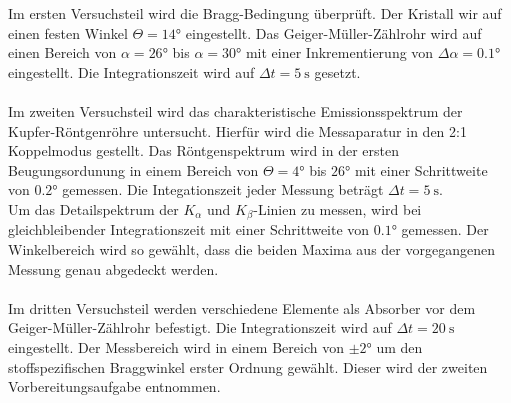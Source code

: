 Im ersten Versuchsteil wird die Bragg-Bedingung überprüft. Der Kristall wir auf einen festen Winkel $Θ = 14°$ eingestellt.
Das Geiger-Müller-Zählrohr wird auf einen Bereich von $α = 26°$ bis $α = 30°$ mit einer Inkrementierung von $Δα = 0.1°$ eingestellt. Die Integrationszeit wird auf $Δt = \SI{5}{\second}$ gesetzt.\\
\\
Im zweiten Versuchsteil wird das charakteristische Emissionsspektrum der Kupfer-Röntgenröhre untersucht. Hierfür wird die Messaparatur in den 2:1 Koppelmodus
gestellt. Das Röntgenspektrum wird in der ersten Beugungsordunung in einem Bereich von $Θ = 4°$ bis $26°$ mit einer Schrittweite von $0.2°$ gemessen. Die Integationszeit jeder Messung beträgt $Δt = \SI{5}{\second}$.\\
Um das Detailspektrum der $K_α$ und $K_β$-Linien zu messen, wird bei gleichbleibender Integrationszeit mit einer Schrittweite von $0.1°$ gemessen. Der Winkelbereich wird so gewählt, dass die beiden Maxima aus der vorgegangenen Messung
genau abgedeckt werden.\\
\\
Im dritten Versuchsteil werden verschiedene Elemente als Absorber vor dem Geiger-Müller-Zählrohr befestigt. Die Integrationszeit wird auf $Δt = \SI{20}{\second}$ eingestellt.
Der Messbereich wird in einem Bereich von $\pm2°$ um den stoffspezifischen Braggwinkel erster Ordnung gewählt. Dieser wird der zweiten Vorbereitungsaufgabe entnommen.\\